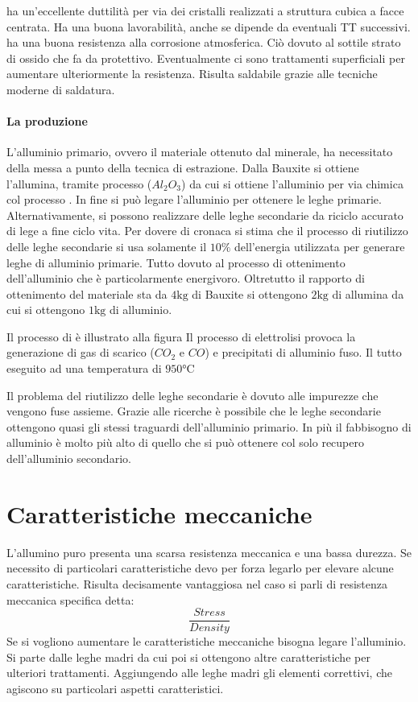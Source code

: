 ha un'eccellente duttilità per via dei cristalli realizzati a struttura cubica a facce centrata.
Ha una buona lavorabilità, anche se dipende da eventuali \ac{TT} successivi.
ha una buona resistenza alla corrosione atmosferica. Ciò dovuto al sottile strato di ossido che fa da protettivo. Eventualmente ci sono trattamenti superficiali per aumentare ulteriormente la resistenza.
Risulta saldabile grazie alle tecniche moderne di saldatura.

\paragraph*{La produzione}
L'alluminio primario, ovvero il materiale ottenuto dal minerale, ha necessitato della messa a punto della tecnica di estrazione.
Dalla Bauxite si ottiene l'allumina, tramite processo  ($Al_2O_3$) da cui si ottiene l'alluminio per via chimica col processo . In fine si può legare l'alluminio per ottenere le leghe primarie.
Alternativamente, si possono realizzare delle leghe secondarie da riciclo accurato di lege a fine ciclo vita. Per dovere di cronaca si stima che il processo di riutilizzo delle leghe secondarie si usa solamente il $10\%$ dell'energia utilizzata per generare leghe di alluminio primarie.
Tutto dovuto al processo di ottenimento dell'alluminio che è particolarmente energivoro.
Oltretutto il rapporto di ottenimento del materiale sta da $4\unit{\kg}$ di Bauxite si ottengono $2\unit{\kg}$ di allumina da cui si ottengono $1\unit{\kg}$ di alluminio.

Il processo di  è illustrato alla figura 
Il processo di elettrolisi provoca la generazione di gas di scarico ($CO_2$ e $CO$) e precipitati di alluminio fuso.
Il tutto eseguito ad una temperatura di $950\unit{\celsius}$

Il problema del riutilizzo delle leghe secondarie è dovuto alle impurezze che vengono fuse assieme. Grazie alle ricerche è possibile che le leghe secondarie ottengono quasi gli stessi traguardi dell'alluminio primario.
In più il fabbisogno di alluminio è molto più alto di quello che si può ottenere col solo recupero dell'alluminio secondario.

\section{Caratteristiche meccaniche}
L'allumino puro presenta una scarsa resistenza meccanica e una bassa durezza.
Se necessito di particolari caratteristiche devo per forza legarlo per elevare alcune caratteristiche.
Risulta decisamente vantaggiosa nel caso si parli di resistenza meccanica specifica detta:
\begin{equation}
\frac{Stress}{Density}
\end{equation}
Se si vogliono aumentare le caratteristiche meccaniche bisogna legare l'alluminio.
Si parte dalle leghe madri da cui poi si ottengono altre caratteristiche per ulteriori trattamenti.
Aggiungendo alle leghe madri gli elementi correttivi, che agiscono su particolari aspetti caratteristici.

